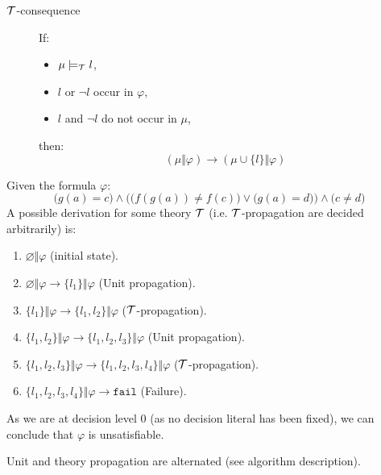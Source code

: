 \begin{description}
        \begin{description}
            \item[$\mathcal{T}$-consequence] 
                If:
                \begin{itemize}
                    \item $\mu \models_{\mathcal{T}} l$,
                    \item $l$ or $\lnot l$ occur in $\varphi$,
                    \item $l$ and $\lnot l$ do not occur in $\mu$, 
                \end{itemize}
                then:
                \[ (\mu \Vert \varphi) \rightarrow (\mu \cup \{ l \} \Vert \varphi) \]
        \end{description}

    \begin{example}
        Given the formula $\varphi$:
        \[ \big( g(a) = c \big) \land \Big( \big( f(g(a)) \neq f(c) \big) \vee \big( g(a) = d \big) \Big) \land \big( c \neq d \big) \]
        A possible derivation for some theory $\mathcal{T}$ (i.e. $\mathcal{T}$-propagation are decided arbitrarily) is:
        \begin{enumerate}
            \item $\varnothing \Vert \varphi$ (initial state).
            \item $\varnothing \Vert \varphi \rightarrow \{ l_1 \} \Vert \varphi$ (Unit propagation).
            \item $\{ l_1 \} \Vert \varphi \rightarrow \{ l_1, l_2 \} \Vert \varphi$ ($\mathcal{T}$-propagation).
            \item $\{ l_1, l_2 \} \Vert \varphi \rightarrow \{ l_1, l_2, l_3 \} \Vert \varphi$ (Unit propagation).
            \item $\{ l_1, l_2, l_3 \} \Vert \varphi \rightarrow \{ l_1, l_2, l_3, l_4 \} \Vert \varphi$ ($\mathcal{T}$-propagation).
            \item $\{ l_1, l_2, l_3, l_4 \} \Vert \varphi \rightarrow \texttt{fail}$ (Failure).
        \end{enumerate}
        As we are at decision level 0 (as no decision literal has been fixed), we can conclude that $\varphi$ is unsatisfiable.

        \begin{remark}
            Unit and theory propagation are alternated (see algorithm description).
        \end{remark}
    \end{example}


\end{description}
